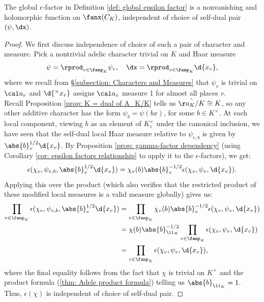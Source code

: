 \documentclass[11pt, x11names, openany]{book}
\begin{document}
\begin{prop}
    \label{prop: global epsilon factor independence}
    The global $\epsilon$-factor in Definition \ref{def: global epsilon factor} is a nonvanishing and holomorphic function on $\fanx(C_K)$, independent of choice of self-dual pair $(\psi, \dx)$.
\end{prop}
\begin{proof}
    We first discuss independence of choice of such a pair of character and measure. Pick a nontrivial adelic character trivial on $K$ and Haar measure
    \begin{equation*}
        \psi = \rprod_{v \in \fanp_K} \psi_v, \quad \dx = \rprod_{v \in \fanp_K} \d{x_v},
    \end{equation*}
    where we recall from \S \ref{subsection: Characters and Measures} that $\psi_v$ is trivial on $\calo_v$ and $\d{^\times x_v}$ assigns $\calo_v$ measure 1 for almost all places $v$.\\ 
    Recall Proposition \ref{prop: K = dual of A_K/K} tells us $\hat{\aa_K/K} \cong K$, so any other additive character has the form $\psi_b = \psi(bx)$, for some $b \in K^\times$. At each local component, viewing $b$ as an element of $K_v^\times$ under the canonical inclusion, we have seen that the self-dual local Haar measure relative to $\psi_{v, b}$ is given by $\abs{b}_v^{1/2} \d{x_v}$. By Proposition \ref{prop: gamma-factor dependency} (using Corollary \ref{cor: epsilon factors relationship} to apply it to the $\epsilon$-factors), we get:
    \begin{equation*}
        \epsilon(\chi_v, \psi_{v, b}, \abs{b}_v^{1/2}\d{x_v}) = \chi_v(b) \abs{b}_v^{-1/2} \epsilon(\chi_v, \psi_v, \d{x_v}).
    \end{equation*}
    Applying this over the product (which also verifies that the restricted product of these modified local measures is a valid measure globally) gives us:
    \begin{align*}
        \prod_{v \in \fanp_K} \epsilon(\chi_v, \psi_{v, b}, \abs{b}_v^{1/2} \d{x_v}) &= \prod_{v \in \fanp_K}  \chi_v(b) \abs{b}_v^{-1/2} \epsilon(\chi_v, \psi_v, \d{x_v})\\
        &= \chi(b) \abs{b}^{-1/2}_{\ii_K} \prod_{v \in \fanp_K} \epsilon(\chi_v, \psi_v, \d{x_v})\\
        &= \prod_{v \in \fanp_K} \epsilon(\chi_v, \psi_v, \d{x_v}),
    \end{align*}
    where the final equality follows from the fact that $\chi$ is trivial on $K^\times$ and the product formula (\ref{thm: Adele product formula}) telling us $\abs{b}_{\ii_K} = 1$. Thus, $\epsilon(\chi)$ is independent of choice of self-dual pair.


\end{proof}
\end{document}
